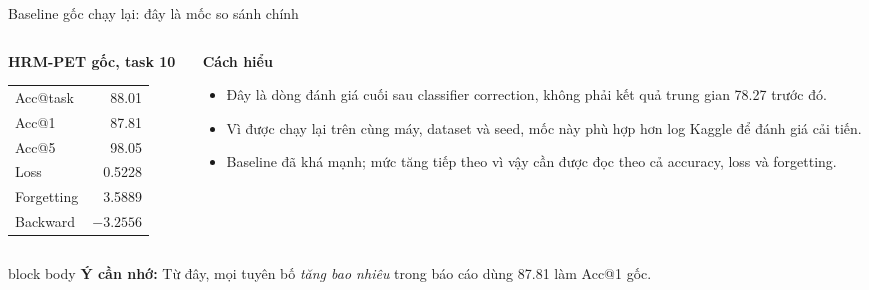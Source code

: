 \documentclass[aspectratio=169,11pt]{beamer}
\newcommand{\remember}[1]{%
  \vfill
  \begin{beamercolorbox}[wd=\textwidth,sep=0.22cm,rounded=true]{block body}
    \textbf{Ý cần nhớ:} #1
  \end{beamercolorbox}
}
\begin{document}
\begin{frame}{Baseline gốc chạy lại: đây là mốc so sánh chính}
  \begin{columns}[T,onlytextwidth]
    \begin{column}{0.47\textwidth}
      {\large\bfseries HRM-PET gốc, task 10}\par\vspace{0.2cm}
      \begin{tabular}{lr}
        Acc@task & 88.01 \\
        Acc@1 & 87.81 \\
        Acc@5 & 98.05 \\
        Loss & 0.5228 \\
        Forgetting & 3.5889 \\
        Backward & $-3.2556$ \\
      \end{tabular}
    \end{column}
    \begin{column}{0.49\textwidth}
      {\large\bfseries Cách hiểu}\par\vspace{0.2cm}
      \begin{itemize}\setlength\itemsep{0.24cm}
        \item Đây là dòng đánh giá cuối sau classifier correction, không phải kết quả trung gian 78.27 trước đó.
        \item Vì được chạy lại trên cùng máy, dataset và seed, mốc này phù hợp hơn log Kaggle để đánh giá cải tiến.
        \item Baseline đã khá mạnh; mức tăng tiếp theo vì vậy cần được đọc theo cả accuracy, loss và forgetting.
      \end{itemize}
    \end{column}
  \end{columns}
  \remember{Từ đây, mọi tuyên bố \emph{tăng bao nhiêu} trong báo cáo dùng 87.81 làm Acc@1 gốc.}
\end{frame}
\end{document}
